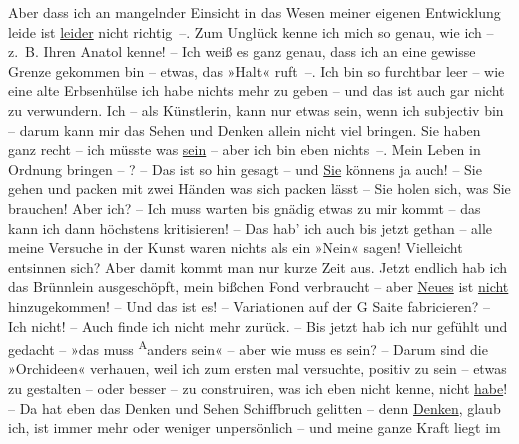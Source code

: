 \pstart
           Aber dass ich \introOben{}an\introOben{} mangelnder Einsicht in das Wesen meiner
               eigenen Entwicklung leide ist \uline{leider} nicht richtig –.
               Zum Unglück kenne ich mich so genau, wie ich – z. B. Ihren Anatol kenne! – Ich weiß es ganz genau, dass ich an eine
               gewisse Grenze gekommen bin – etwas, das »Halt« ruft –. Ich bin so furchtbar leer –
               wie eine alte Erbsenhülse {\pb}ich habe nichts mehr zu geben – und das ist
               auch gar nicht zu verwundern. Ich – als Künstlerin, kann nur etwas sein, wenn ich
               subjectiv bin – darum kann mir das Sehen und Denken \introOben{}allein\introOben{}
               nicht viel bringen. Sie haben ganz recht – ich müsste was \uline{sein} – aber ich bin eben nichts –. Mein Leben in Ordnung bringen – ? – Das ist
               so hin gesagt – und \uline{Sie} könnens ja auch! – Sie gehen
               und packen mit zwei Händen was sich packen lässt – Sie holen sich, was Sie brauchen!
               Aber ich? – Ich muss warten bis gnädig etwas zu mir kommt – das kann ich \introOben{}dann\introOben{} höchstens kritisieren! – Das hab’ ich auch bis jetzt
               gethan – alle meine Versuche in der Kunst waren nichts als ein »Nein« sagen!
               Vielleicht entsinnen sich? Aber damit kommt man nur kurze Zeit aus. Jetzt endlich hab
               ich das Brünnlein ausgeschöpft, mein bißchen Fond verbraucht – aber \uline{Neues} ist \uline{nicht}
               hinzugekommen! – Und das ist es! – Variationen auf der G Saite fabricieren? – Ich
               nicht! – Auch finde ich nicht mehr zurück. – Bis jetzt hab ich nur gefühlt und gedacht
               – »das muss \substVorne{}\textsuperscript{A}\substDazwischen{}a\substHinten{}nders sein« – {\pb}aber wie muss es sein? – Darum sind die »Orchideen« verhauen, weil ich zum ersten mal
               versuchte, positiv zu sein – etwas zu gestalten – oder besser – zu construiren, was
               ich eben nicht kenne, nicht \uline{habe}! – Da hat eben das
               Denken und Sehen Schiffbruch gelitten – denn \uline{Denken},
               glaub ich, ist immer mehr oder weniger unpersönlich – und meine ganze Kraft liegt im
